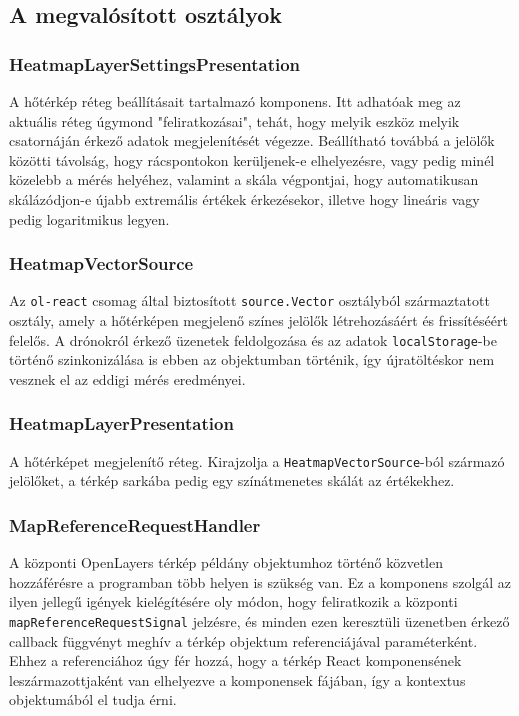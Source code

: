 \subsection{A megvalósított osztályok}

\subsubsection{HeatmapLayerSettingsPresentation}
A hőtérkép réteg beállításait tartalmazó komponens.
Itt adhatóak meg az aktuális réteg úgymond "feliratkozásai", tehát, hogy melyik
eszköz melyik csatornáján érkező adatok megjelenítését végezze.
Beállítható továbbá a jelölők közötti távolság, hogy rácspontokon kerüljenek-e
elhelyezésre, vagy pedig minél közelebb a mérés helyéhez, valamint a skála
végpontjai, hogy automatikusan skálázódjon-e újabb extremális értékek
érkezésekor, illetve hogy lineáris vagy pedig logaritmikus legyen.

\subsubsection{HeatmapVectorSource}
Az \verb|ol-react| csomag által biztosított \verb|source.Vector| osztályból
származtatott osztály, amely a hőtérképen megjelenő színes jelölők
létrehozásáért és frissítéséért felelős.
A drónokról érkező üzenetek feldolgozása és az adatok \verb|localStorage|-be
történő szinkonizálása is ebben az objektumban történik, így újratöltéskor nem
vesznek el az eddigi mérés eredményei.

\subsubsection{HeatmapLayerPresentation}
A hőtérképet megjelenítő réteg. Kirajzolja a \verb|HeatmapVectorSource|-ból
származó jelölőket, a térkép sarkába pedig egy színátmenetes skálát az
értékekhez.

\subsubsection{MapReferenceRequestHandler}
A központi OpenLayers térkép példány objektumhoz történő közvetlen hozzáférésre
a programban több helyen is szükség van. Ez a komponens szolgál az ilyen jellegű
igények kielégítésére oly módon, hogy feliratkozik a központi
\verb|mapReferenceRequestSignal| jelzésre, és minden ezen keresztüli üzenetben
érkező callback függvényt meghív a térkép objektum referenciájával
paraméterként. Ehhez a referenciához úgy fér hozzá, hogy a térkép React
komponensének leszármazottjaként van elhelyezve a komponensek fájában, így a
kontextus objektumából el tudja érni.

